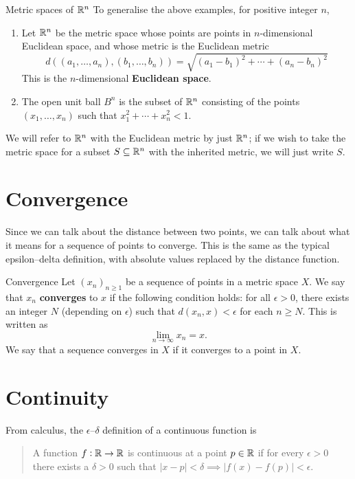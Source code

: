 \begin{exmp}{Metric spaces of $\mathbb R^n$}{}
To generalise the above examples, for positive integer $n$,
\begin{enumerate}[label=(\alph*)]
\item Let $\mathbb R^n$ be the metric space whose points are points in $n$-dimensional Euclidean space, and whose metric is the Euclidean metric
\[ d((a_1,\dots,a_n),(b_1,\dots,b_n)) = \sqrt{(a_1-b_1)^2 + \cdots + (a_n-b_n)^2} \]
This is the $n$-dimensional \textbf{Euclidean space}.
\item The open unit ball $B^n$ is the subset of $\mathbb R^n$ consisting of the points $(x_1,\dots,x_n)$ such that $x_1^2+\cdots+x_n^2<1$.
\end{enumerate}
\end{exmp}

\begin{notation}
We will refer to $\mathbb R^n$ with the Euclidean metric by just $\mathbb R^n$; if we wish to take the metric space for a subset $S \subseteq \mathbb R^n$ with the inherited metric, we will just write $S$.
\end{notation}
\pagebreak

\section{Convergence}
Since we can talk about the distance between two points, we can talk about what it means for a sequence of points to converge. This is the same as the typical epsilon--delta definition, with absolute values replaced by the distance function.

\begin{defn}{Convergence}{}
Let $(x_n)_{n \ge 1}$ be a sequence of points in a metric space $X$. We say that $x_n$ \textbf{converges} to $x$ if the following condition holds: for all $\epsilon > 0$, there exists an integer $N$ (depending on $\epsilon$) such that $d(x_n,x) < \epsilon$ for each $n \ge N$. This is written as
\[ \lim_{n\to\infty} x_n = x. \]
We say that a sequence converges in $X$ if it converges to a point in $X$.
\end{defn}
\pagebreak

\section{Continuity}
From calculus, the $\epsilon$--$\delta$ definition of a continuous function is
\begin{quote}
A function $f: \mathbb R \to \mathbb R$ is continuous at a point $p \in \mathbb R$ if for every $\epsilon > 0$ there exists a $\delta > 0$ such that $|x-p| < \delta \implies |f(x)-f(p)| < \epsilon$.
\end{quote}

